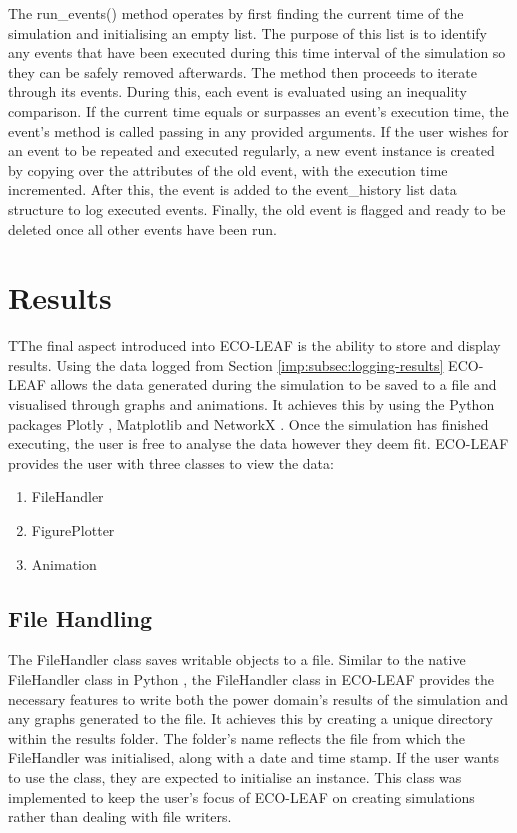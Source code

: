 \documentclass{l4proj}
\begin{document}
The run\_events() method operates by first finding the current time of the simulation and initialising an empty list.
The purpose of this list is to identify any events that have been executed during this time interval of the simulation so they can be safely removed afterwards.
The method then proceeds to iterate through its events.
During this, each event is evaluated using an inequality comparison.
If the current time equals or surpasses an event's execution time, the event's method is called passing in any provided arguments.
If the user wishes for an event to be repeated and executed regularly, a new event instance is created by copying over the attributes of the old event, with the execution time incremented.
After this, the event is added to the event\_history list data structure to log executed events.
Finally, the old event is flagged and ready to be deleted once all other events have been run.

\section{Results}\label{sec:displaying-results}
TThe final aspect introduced into ECO-LEAF is the ability to store and display results.
Using the data logged from Section \ref{imp:subsec:logging-results} ECO-LEAF allows the data generated during the simulation to be saved to a file and visualised through graphs and animations.
It achieves this by using the Python packages Plotly \citep{plotly-git}, Matplotlib \citep{Hunter:2007} and NetworkX \citep{networkx}.
Once the simulation has finished executing, the user is free to analyse the data however they deem fit.
ECO-LEAF provides the user with three classes to view the data:

\begin{enumerate}
    \item FileHandler
    \item FigurePlotter
    \item Animation
\end{enumerate}

\subsection{File Handling}\label{subsec:imp:filehandler}
The FileHandler class saves writable objects to a file.
Similar to the native FileHandler class in Python \citep{python-docs-FileHandler}, the FileHandler class in ECO-LEAF provides the necessary features to write both the power domain's results of the simulation and any graphs generated to the file.
It achieves this by creating a unique directory within the results folder. The folder's name reflects the file from which the FileHandler was initialised, along with a date and time stamp.
If the user wants to use the class, they are expected to initialise an instance.
This class was implemented to keep the user's focus of ECO-LEAF on creating simulations rather than dealing with file writers.
\end{document}
